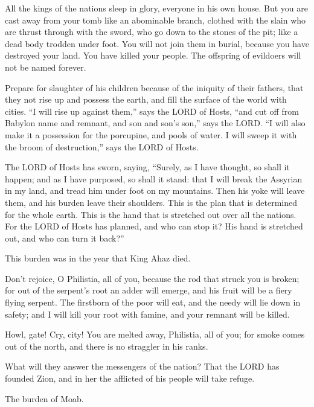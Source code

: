 \myverse{}All the kings of the nations sleep in glory, everyone in his
own house.
\myverse{}But you are cast away from your tomb like an abominable branch, clothed with
the slain who are thrust through with the sword, who go down to the stones of the pit; like a dead body
trodden under foot.
\myverse{}You will not join them in burial, because you have destroyed your land. You
have killed your people. The offspring of evildoers will not be named forever.

\myverse{}Prepare for slaughter of his children because of the iniquity
of their fathers, that they not rise up and possess the earth, and fill the surface of the world with
cities.
\myverse{}“I will rise up against them,” says the LORD of Hosts, “and cut off from
Babylon name and remnant, and son and son’s son,” says the LORD.
\myverse{}“I will also make it a possession for the porcupine, and pools of water.
I will sweep it with the broom of destruction,” says the LORD of Hosts.

\myverse{}The LORD of Hosts has sworn, saying, “Surely, as I have thought,
so shall it happen; and as I have purposed, so shall it stand:
\myverse{}that I will break the Assyrian in my land, and tread him under foot on my
mountains. Then his yoke will leave them, and his burden leave their shoulders.
\myverse{}This is the plan that is determined for the whole earth. This is the hand
that is stretched out over all the nations.
\myverse{}For the LORD of Hosts has planned, and who can stop it? His hand is stretched
out, and who can turn it back?”

\myverse{}This burden was in the year that King Ahaz died.

\myverse{}Don’t rejoice, O Philistia, all of you, because the rod that
struck you is broken; for out of the serpent’s root an adder will emerge, and his fruit will be a fiery
flying serpent.
\myverse{}The firstborn of the poor will eat, and the needy will lie down in safety;
and I will kill your root with famine, and your remnant will be killed.

\myverse{}Howl, gate! Cry, city! You are melted away, Philistia, all of
you; for smoke comes out of the north, and there is no straggler in his ranks.

\myverse{}What will they answer the messengers of the nation? That the
LORD has founded Zion, and in her the afflicted of his people will take refuge.


\mychapter{} \myverse*{}The burden of Moab.

